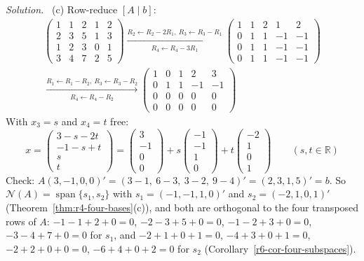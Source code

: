 \documentclass[12pt]{article}
\newcommand{\R}{\mathbb R}
\DeclareMathOperator{\Span}{span}
\theoremstyle{definition}
\newenvironment{solution}{\par\noindent\textit{Solution.}\ }{\par\smallskip}
\begin{document}
\begin{solution}
(c) Row-reduce \([A\mid b]\):
\[
\begin{gathered}
\left(\begin{array}{cccc|c}1&1&2&1&2\\2&3&5&1&3\\1&2&3&0&1\\3&4&7&2&5\end{array}\right)
\xrightarrow[R_4\leftarrow R_4-3R_1]{R_2\leftarrow R_2-2R_1,\ R_3\leftarrow R_3-R_1}
\left(\begin{array}{cccc|c}1&1&2&1&2\\0&1&1&-1&-1\\0&1&1&-1&-1\\0&1&1&-1&-1\end{array}\right)
\\
\xrightarrow[R_4\leftarrow R_4-R_2]{R_1\leftarrow R_1-R_2,\ R_3\leftarrow R_3-R_2}
\left(\begin{array}{cccc|c}1&0&1&2&3\\0&1&1&-1&-1\\0&0&0&0&0\\0&0&0&0&0\end{array}\right)
\end{gathered}
\]
With \(x_3=s\) and \(x_4=t\) free:
\[
x=\begin{pmatrix}3-s-2t\\-1-s+t\\s\\t\end{pmatrix}=\begin{pmatrix}3\\-1\\0\\0\end{pmatrix}+s\begin{pmatrix}-1\\-1\\1\\0\end{pmatrix}
+t\begin{pmatrix}-2\\1\\0\\1\end{pmatrix}\qquad(s,t\in\R)
\]
Check: \(A(3,-1,0,0)'=(3-1,\ 6-3,\ 3-2,\ 9-4)'=(2,3,1,5)'=b\). So \(\mathcal N(A)=\Span\{s_1,s_2\}\) with
\(s_1=(-1,-1,1,0)'\) and \(s_2=(-2,1,0,1)'\) (Theorem~\ref{thm:r4-four-bases}(c)), and both are orthogonal to the four
transposed rows of \(A\): \(-1-1+2+0=0\), \(-2-3+5+0=0\), \(-1-2+3+0=0\), \(-3-4+7+0=0\) for \(s_1\), and \(-2+1+0+1=0\),
\(-4+3+0+1=0\), \(-2+2+0+0=0\), \(-6+4+0+2=0\) for \(s_2\) (Corollary~\ref{r6-cor-four-subspaces}).
\end{solution}
\end{document}
